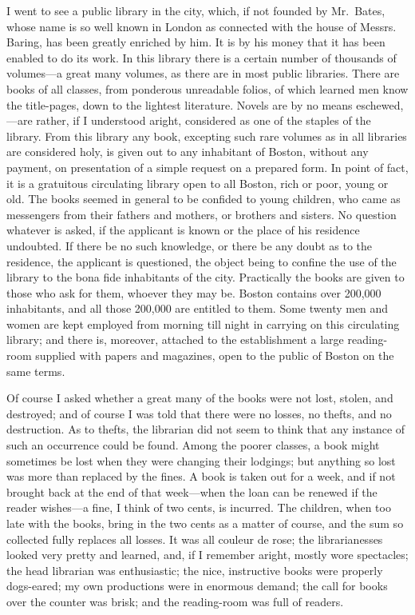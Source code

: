 I went to see a public library in the city, which, if not founded
by Mr.\ Bates, whose name is so well known in London as connected
with the house of Messrs. Baring, has been greatly enriched by him.
It is by his money that it has been enabled to do its work.  In
this library there is a certain number of thousands of volumes---a
great many volumes, as there are in most public libraries.  There
are books of all classes, from ponderous unreadable folios, of
which learned men know the title-pages, down to the lightest
literature.  Novels are by no means eschewed,---are rather, if I
understood aright, considered as one of the staples of the library.
From this library any book, excepting such rare volumes as in all
libraries are considered holy, is given out to any inhabitant of
Boston, without any payment, on presentation of a simple request on
a prepared form.  In point of fact, it is a gratuitous circulating
library open to all Boston, rich or poor, young or old.  The books
seemed in general to be confided to young children, who came as
messengers from their fathers and mothers, or brothers and sisters.
No question whatever is asked, if the applicant is known or the
place of his residence undoubted.  If there be no such knowledge,
or there be any doubt as to the residence, the applicant is
questioned, the object being to confine the use of the library to
the bona fide inhabitants of the city.  Practically the books are
given to those who ask for them, whoever they may be.  Boston
contains over 200,000 inhabitants, and all those 200,000 are
entitled to them.  Some twenty men and women are kept employed from
morning till night in carrying on this circulating library; and
there is, moreover, attached to the establishment a large reading-
room supplied with papers and magazines, open to the public of
Boston on the same terms.

Of course I asked whether a great many of the books were not lost,
stolen, and destroyed; and of course I was told that there were no
losses, no thefts, and no destruction.  As to thefts, the librarian
did not seem to think that any instance of such an occurrence could
be found.  Among the poorer classes, a book might sometimes be lost
when they were changing their lodgings; but anything so lost was
more than replaced by the fines.  A book is taken out for a week,
and if not brought back at the end of that week---when the loan can
be renewed if the reader wishes---a fine, I think of two cents, is
incurred.  The children, when too late with the books, bring in the
two cents as a matter of course, and the sum so collected fully
replaces all losses.  It was all couleur de rose; the
librarianesses looked very pretty and learned, and, if I remember
aright, mostly wore spectacles; the head librarian was
enthusiastic; the nice, instructive books were properly dogs-eared;
my own productions were in enormous demand; the call for books over
the counter was brisk; and the reading-room was full of readers.

